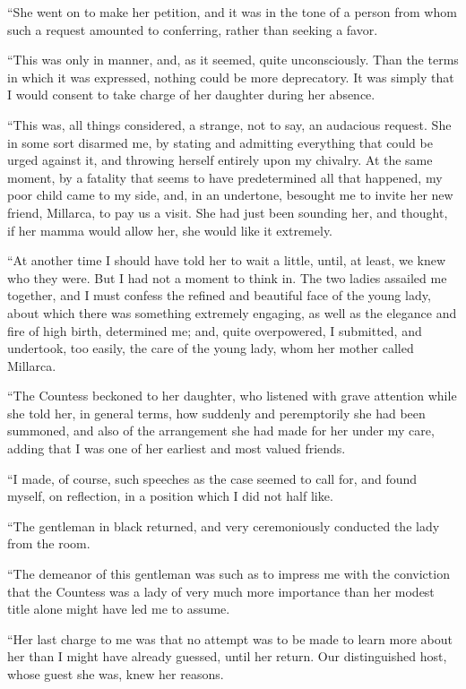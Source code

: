 \documentclass[11pt,twoside,makeidx,hidelinks,]{memoir}
\begin{document}
``She went on to make her petition, and it was in the tone of a person
from whom such a request amounted to conferring, rather than seeking
a favor.

``This was only in manner, and, as it seemed, quite unconsciously. Than
the terms in which it was expressed, nothing could be more deprecatory.
It was simply that I would consent to take charge of her daughter during
her absence.

``This was, all things considered, a strange, not to say, an audacious
request. She in some sort disarmed me, by stating and admitting
everything that could be urged against it, and throwing herself entirely
upon my chivalry. At the same moment, by a fatality that seems to have
predetermined all that happened, my poor child came to my side, and, in
an undertone, besought me to invite her new friend, Millarca, to pay us
a visit. She had just been sounding her, and thought, if her mamma would
allow her, she would like it extremely.

``At another time I should have told her to wait a little, until, at
least, we knew who they were. But I had not a moment to think in. The
two ladies assailed me together, and I must confess the refined and
beautiful face of the young lady, about which there was something
extremely engaging, as well as the elegance and fire of high birth,
determined me; and, quite overpowered, I submitted, and undertook, too
easily, the care of the young lady, whom her mother called Millarca.

``The Countess beckoned to her daughter, who listened with grave
attention while she told her, in general terms, how suddenly and
peremptorily she had been summoned, and also of the arrangement she had
made for her under my care, adding that I was one of her earliest and
most valued friends.

``I made, of course, such speeches as the case seemed to call for, and
found myself, on reflection, in a position which I did not half like.

``The gentleman in black returned, and very ceremoniously conducted the
lady from the room.

``The demeanor of this gentleman was such as to impress me with the
conviction that the Countess was a lady of very much more importance
than her modest title alone might have led me to assume.

``Her last charge to me was that no attempt was to be made to learn more
about her than I might have already guessed, until her return. Our
distinguished host, whose guest she was, knew her reasons.
\end{document}
